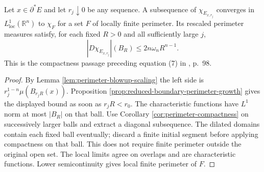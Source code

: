 \begin{proposition}\label{prop:reduced-boundary-blowup-compactness}
Let $x\in\partial^*E$ and let $r_j\downarrow0$ be any sequence. A subsequence of $\chi_{E_{x,r_j}}$ converges in $L^1_{\mathrm{loc}}(\mathbb R^n)$ to $\chi_F$ for a set $F$ of locally finite perimeter. Its rescaled perimeter measures satisfy, for each fixed $R>0$ and all sufficiently large $j$,
\[
 |D\chi_{E_{x,r_j}}|(B_R)\leq2n\omega_n R^{n-1}.
\]
This is the compactness passage preceding equation (7) in \cite{Sim18}, p.~98.
\end{proposition}
\begin{proof}
By Lemma \ref{lem:perimeter-blowup-scaling} the left side is $r_j^{1-n}\mu(B_{r_jR}(x))$. Proposition \ref{prop:reduced-boundary-perimeter-growth} gives the displayed bound as soon as $r_jR<r_0$. The characteristic functions have $L^1$ norm at most $|B_R|$ on that ball. Use Corollary \ref{cor:perimeter-compactness} on successively larger balls and extract a diagonal subsequence. The dilated domains contain each fixed ball eventually; discard a finite initial segment before applying compactness on that ball. This does not require finite perimeter outside the original open set. The local limits agree on overlaps and are characteristic functions. Lower semicontinuity gives local finite perimeter of $F$.
\end{proof}

